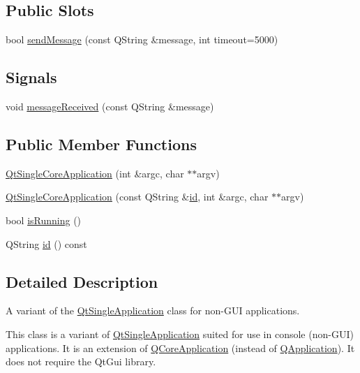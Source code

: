 \subsection*{Public Slots}
\begin{DoxyCompactItemize}
\item 
bool \hyperlink{class_qt_single_core_application_a07493d0807b216ca870adc6d40f856b0}{send\+Message} (const Q\+String \&message, int timeout=5000)
\end{DoxyCompactItemize}
\subsection*{Signals}
\begin{DoxyCompactItemize}
\item 
void \hyperlink{class_qt_single_core_application_a1af66a1770ff5eec8006a26a2ce42ca1}{message\+Received} (const Q\+String \&message)
\end{DoxyCompactItemize}
\subsection*{Public Member Functions}
\begin{DoxyCompactItemize}
\item 
\hyperlink{class_qt_single_core_application_a1329cb65a5706c21257f191b9d8b6548}{Qt\+Single\+Core\+Application} (int \&argc, char $\ast$$\ast$argv)
\item 
\hyperlink{class_qt_single_core_application_a2c5792a0addef95dd78b37ab55a985a7}{Qt\+Single\+Core\+Application} (const Q\+String \&\hyperlink{class_qt_single_core_application_aad587c2d4536fd153672af7ee0389478}{id}, int \&argc, char $\ast$$\ast$argv)
\item 
bool \hyperlink{class_qt_single_core_application_a419bfb7b02f0459f4d207d448bc6c876}{is\+Running} ()
\item 
Q\+String \hyperlink{class_qt_single_core_application_aad587c2d4536fd153672af7ee0389478}{id} () const 
\end{DoxyCompactItemize}


\subsection{Detailed Description}
A variant of the \hyperlink{class_qt_single_application}{Qt\+Single\+Application} class for non-\/\+G\+UI applications. 

This class is a variant of \hyperlink{class_qt_single_application}{Qt\+Single\+Application} suited for use in console (non-\/\+G\+UI) applications. It is an extension of \hyperlink{class_q_core_application}{Q\+Core\+Application} (instead of \hyperlink{class_q_application}{Q\+Application}). It does not require the Qt\+Gui library.

